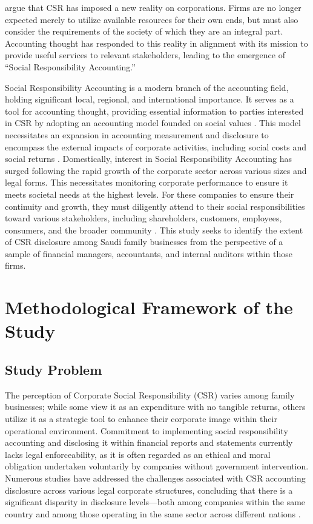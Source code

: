 \documentclass[10pt]{NSP1}
\begin{document}
\cite{AbdelSalam2018} argue that CSR has imposed a new reality on corporations. Firms are no longer expected merely to utilize available resources for their own ends, but must also consider the requirements of the society of which they are an integral part. Accounting thought has responded to this reality in alignment with its mission to provide useful services to relevant stakeholders, leading to the emergence of ``Social Responsibility Accounting.''

Social Responsibility Accounting is a modern branch of the accounting field, holding significant local, regional, and international importance. It serves as a tool for accounting thought, providing essential information to parties interested in CSR by adopting an accounting model founded on social values \cite{AbdelHaq2022}. This model necessitates an expansion in accounting measurement and disclosure to encompass the external impacts of corporate activities, including social costs and social returns \cite{Tarshi2017}. Domestically, interest in Social Responsibility Accounting has surged following the rapid growth of the corporate sector across various sizes and legal forms. This necessitates monitoring corporate performance to ensure it meets societal needs at the highest levels. For these companies to ensure their continuity and growth, they must diligently attend to their social responsibilities toward various stakeholders, including shareholders, customers, employees, consumers, and the broader community \cite{Habbash2018}. This study seeks to identify the extent of CSR disclosure among Saudi family businesses from the perspective of a sample of financial managers, accountants, and internal auditors within those firms.

\section{Methodological Framework of the Study}

\subsection{Study Problem}

The perception of Corporate Social Responsibility (CSR) varies among family businesses; while some view it as an expenditure with no tangible returns, others utilize it as a strategic tool to enhance their corporate image within their operational environment. Commitment to implementing social responsibility accounting and disclosing it within financial reports and statements currently lacks legal enforceability, as it is often regarded as an ethical and moral obligation undertaken voluntarily by companies without government intervention. Numerous studies have addressed the challenges associated with CSR accounting disclosure across various legal corporate structures, concluding that there is a significant disparity in disclosure levels—both among companies within the same country and among those operating in the same sector across different nations \cite{Hussainey2011}.
\end{document}
